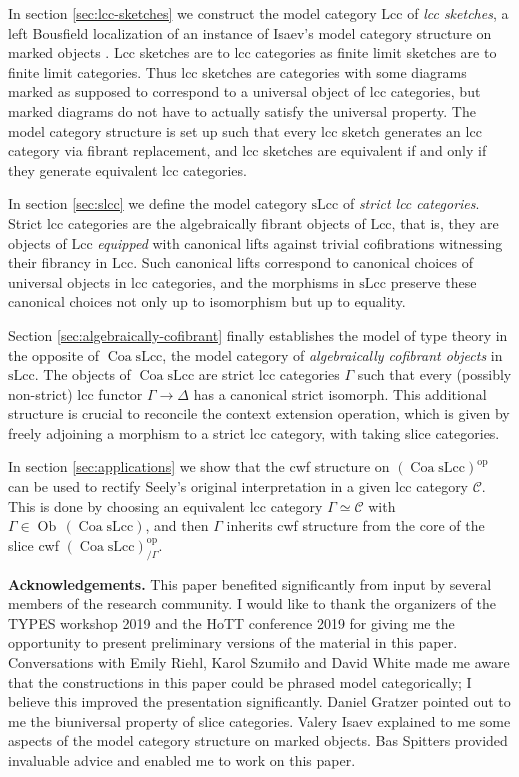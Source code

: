 \documentclass[a4paper]{article}
\theoremstyle{remark}
\theoremstyle{definition}
\begin{document}
In section \ref{sec:lcc-sketches} we construct the model category $\mathrm{Lcc}$ of \emph{lcc sketches}, a left Bousfield localization of an instance of Isaev's model category structure on marked objects \citep{marked-objects}.
Lcc sketches are to lcc categories as finite limit sketches are to finite limit categories.
Thus lcc sketches are categories with some diagrams marked as supposed to correspond to a universal object of lcc categories, but marked diagrams do not have to actually satisfy the universal property.
The model category structure is set up such that every lcc sketch generates an lcc category via fibrant replacement, and lcc sketches are equivalent if and only if they generate equivalent lcc categories.

In section \ref{sec:slcc} we define the model category $\mathrm{sLcc}$ of \emph{strict lcc categories}.
Strict lcc categories are the algebraically fibrant objects of $\mathrm{Lcc}$, that is, they are objects of $\mathrm{Lcc}$ \emph{equipped} with canonical lifts against trivial cofibrations witnessing their fibrancy in $\mathrm{Lcc}$.
Such canonical lifts correspond to canonical choices of universal objects in lcc categories, and the morphisms in $\mathrm{sLcc}$ preserve these canonical choices not only up to isomorphism but up to equality.

Section \ref{sec:algebraically-cofibrant} finally establishes the model of type theory in the opposite of $\operatorname{Coa} \mathrm{sLcc}$, the model category of \emph{algebraically cofibrant objects} in $\mathrm{sLcc}$.
The objects of $\operatorname{Coa} \mathrm{sLcc}$ are strict lcc categories $\Gamma$ such that every (possibly non-strict) lcc functor $\Gamma \rightarrow \Delta$ has a canonical strict isomorph.
This additional structure is crucial to reconcile the context extension operation, which is given by freely adjoining a morphism to a strict lcc category, with taking slice categories.

In section \ref{sec:applications} we show that the cwf structure on $(\operatorname{Coa} \mathrm{sLcc})^\mathrm{op}$ can be used to rectify Seely's original interpretation in a given lcc category $\mathcal{C}$.
This is done by choosing an equivalent lcc category $\Gamma \simeq \mathcal{C}$ with $\Gamma \in \operatorname{Ob} \, (\operatorname{Coa} \mathrm{sLcc})$, and then $\Gamma$ inherits cwf structure from the core of the slice cwf $(\operatorname{Coa} \mathrm{sLcc})^\mathrm{op}_{ / \Gamma}$.

\textbf{Acknowledgements.}
This paper benefited significantly from input by several members of the research community.
I would like to thank the organizers of the TYPES workshop 2019 and the HoTT conference 2019 for giving me the opportunity to present preliminary versions of the material in this paper.
Conversations with Emily Riehl, Karol Szumiło and David White made me aware that the constructions in this paper could be phrased model categorically; I believe this improved the presentation significantly.
Daniel Gratzer pointed out to me the biuniversal property of slice categories.
Valery Isaev explained to me some aspects of the model category structure on marked objects.
Bas Spitters provided invaluable advice and enabled me to work on this paper.
\end{document}
